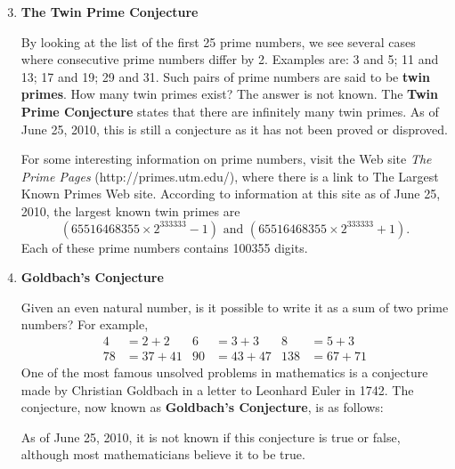 \begin{enumerate}
\setcounter{enumi}{2}
\item \textbf{The Twin Prime Conjecture}

By looking at the list of the first 25 prime numbers, we see several cases where consecutive prime numbers differ by 2.  Examples are:  3  and  5;  11 and  13;  17 and  19; 29  and  31.  Such pairs of prime numbers are said to be \textbf{twin primes}.
%
%
  How many twin primes exist?  The answer is not known.  The \textbf{Twin Prime Conjecture}
%
 states that there are infinitely many twin primes.  As of June 25, 2010, this is still a conjecture as it has not been proved or disproved.


For some interesting information on prime numbers, visit the Web site \textit{The Prime Pages} 
 (http://primes.utm.edu/), 
where there is a link to The Largest Known Primes Web site. 
According to information at this site  
 as of June 25, 2010, the largest known twin primes are
\[ 
\left( 65516468355 \times 2^{333333} - 1 \right) \text{ and } 
\left( 65516468355 \times 2^{333333} + 1 \right).
\]
Each of these prime numbers contains 100355 digits. 

\item \textbf{Goldbach's Conjecture} 

Given an even natural number, is it possible to write it as a sum of two prime numbers?  For example,
\begin{align*}
4 &= 2 + 2  &   6 &= 3 + 3  &  8 &= 5+3 \\ 
78 &= 37 + 41 &  90 &= 43 + 47  &  138 &= 67 + 71 
\end{align*}
One of the most famous unsolved problems in mathematics is a conjecture made by Christian Goldbach in a letter to Leonhard Euler in 1742.  The conjecture, now known as \textbf{Goldbach's Conjecture}, is as follows:
As of June 25, 2010, it is not known if this conjecture is true or false, although most mathematicians believe it to be true.
\hbreak
\end{enumerate}

\endinput
